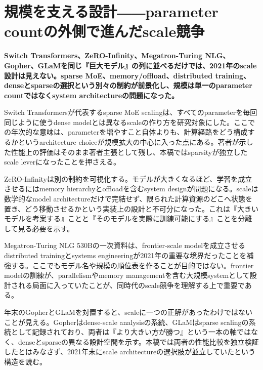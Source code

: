 \section{規模を支える設計――parameter countの外側で進んだscale競争}
\noindent\textbf{Switch Transformers、ZeRO-Infinity、Megatron-Turing NLG、Gopher、GLaMを同じ『巨大モデル』の列に並べるだけでは、2021年のscale設計は見えない。sparse MoE、memory/offload、distributed training、denseとsparseの選択という別々の制約が前景化し、規模は単一のparameter countではなくsystem architectureの問題になった。}\autocite{src-0028da50cfe5,src-7652e568e428,src-7b8be93e524d,src-7fa5b597ba1f,src-b307b4b82867,src-d15ca2441916}

Switch Transformersが代表するsparse MoE scalingは、すべてのparameterを毎回同じように使うdense modelとは異なるscaleの作り方を研究対象にした。ここでの年次的な意味は、parameterを増やすこと自体よりも、計算経路をどう構成するかというarchitecture choiceが規模拡大の中心に入った点にある。著者が示した性能上の評価はそのまま著者主張として残し、本稿ではsparsityが独立したscale leverになったことを押さえる。\autocite{src-7fa5b597ba1f}


ZeRO-Infinityは別の制約を可視化する。モデルが大きくなるほど、学習を成立させるにはmemory hierarchyとoffloadを含むsystem designが問題になる。scaleは数学的なmodel architectureだけで完結せず、限られた計算資源のどこへ状態を置き、どう移動させるかという実装上の設計と不可分になった。これは『大きいモデルを考案する』ことと『そのモデルを実際に訓練可能にする』ことを分離して見る必要を示す。\autocite{src-7b8be93e524d}


Megatron-Turing NLG 530Bの一次資料は、frontier-scale modelを成立させるdistributed trainingとsystems engineeringが2021年の重要な境界だったことを補強する。ここでもモデル名や規模の順位表を作ることが目的ではない。frontier modelの訓練が、parallelismやmemory managementを含む大規模systemとして設計される局面に入っていたことが、同時代のscale競争を理解する上で重要である。\autocite{src-b307b4b82867}


年末のGopherとGLaMを対置すると、scaleに一つの正解があったわけではないことが見える。Gopherはdense-scale analysisの系統、GLaMはsparse scalingの系統として記録されており、両者は『より大きい方が勝つ』という一本の軸ではなく、denseとsparseの異なる設計空間を示す。本稿では両者の性能比較を独立検証したとはみなさず、2021年末にscale architectureの選択肢が並立していたという構造を読む。\autocite{src-0028da50cfe5,src-7652e568e428,src-d15ca2441916}


